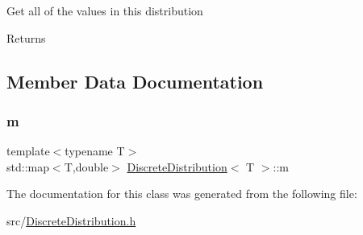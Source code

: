 Get all of the values in this distribution \begin{DoxyReturn}{Returns}

\end{DoxyReturn}


\subsection{Member Data Documentation}
\mbox{\label{class_discrete_distribution_a72a09b5b79a5bf0c55f780b9a81271fb}} 
\subsubsection{\texorpdfstring{m}{m}}
{\footnotesize\ttfamily template$<$typename T$>$ \\
std\+::map$<$T,double$>$ \hyperlink{class_discrete_distribution}{Discrete\+Distribution}$<$ T $>$\+::m}



The documentation for this class was generated from the following file\+:\begin{DoxyCompactItemize}
\item 
src/\hyperlink{_discrete_distribution_8h}{Discrete\+Distribution.\+h}\end{DoxyCompactItemize}
